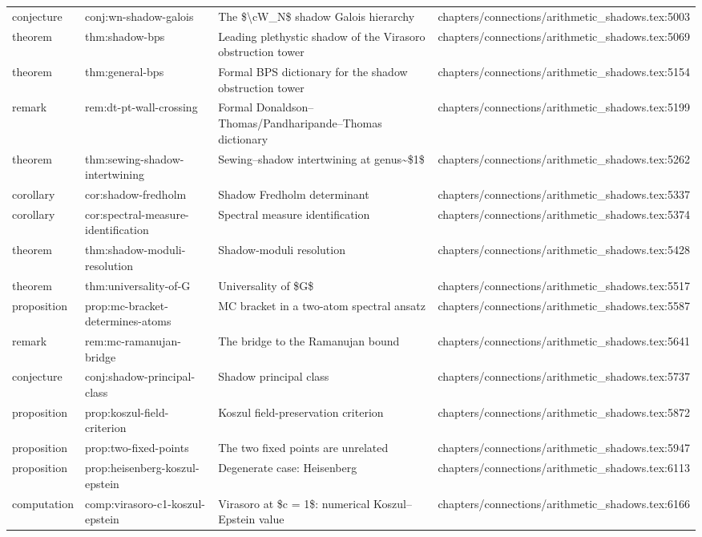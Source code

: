 \documentclass[11pt]{article}
\begin{document}
\begin{longtable}{L{0.10\textwidth}L{0.26\textwidth}L{0.42\textwidth}L{0.22\textwidth}}
conjecture & conj:wn-shadow-galois & The \$\textbackslash{}cW\_N\$ shadow Galois hierarchy & chapters/connections/arithmetic\_shadows.tex:5003\\
theorem & thm:shadow-bps & Leading plethystic shadow of the Virasoro obstruction tower & chapters/connections/arithmetic\_shadows.tex:5069\\
theorem & thm:general-bps & Formal BPS dictionary for the shadow obstruction tower & chapters/connections/arithmetic\_shadows.tex:5154\\
remark & rem:dt-pt-wall-crossing & Formal Donaldson--Thomas/Pandharipande--Thomas dictionary & chapters/connections/arithmetic\_shadows.tex:5199\\
theorem & thm:sewing-shadow-intertwining & Sewing--shadow intertwining at genus\textasciitilde{}\$1\$ & chapters/connections/arithmetic\_shadows.tex:5262\\
corollary & cor:shadow-fredholm & Shadow Fredholm determinant & chapters/connections/arithmetic\_shadows.tex:5337\\
corollary & cor:spectral-measure-identification & Spectral measure identification & chapters/connections/arithmetic\_shadows.tex:5374\\
theorem & thm:shadow-moduli-resolution & Shadow-moduli resolution & chapters/connections/arithmetic\_shadows.tex:5428\\
theorem & thm:universality-of-G & Universality of \$G\$ & chapters/connections/arithmetic\_shadows.tex:5517\\
proposition & prop:mc-bracket-determines-atoms & MC bracket in a two-atom spectral ansatz & chapters/connections/arithmetic\_shadows.tex:5587\\
remark & rem:mc-ramanujan-bridge & The bridge to the Ramanujan bound & chapters/connections/arithmetic\_shadows.tex:5641\\
conjecture & conj:shadow-principal-class & Shadow principal class & chapters/connections/arithmetic\_shadows.tex:5737\\
proposition & prop:koszul-field-criterion & Koszul field-preservation criterion & chapters/connections/arithmetic\_shadows.tex:5872\\
proposition & prop:two-fixed-points & The two fixed points are unrelated & chapters/connections/arithmetic\_shadows.tex:5947\\
proposition & prop:heisenberg-koszul-epstein & Degenerate case: Heisenberg & chapters/connections/arithmetic\_shadows.tex:6113\\
computation & comp:virasoro-c1-koszul-epstein & Virasoro at \$c = 1\$: numerical Koszul--Epstein value & chapters/connections/arithmetic\_shadows.tex:6166\\

\end{longtable}
\end{document}
